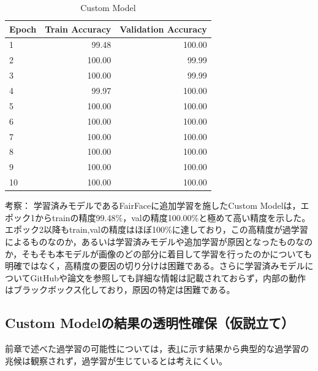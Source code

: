 \documentclass[a4paper,11pt,titlepage]{jsarticle}
\begin{document}
\begin{table}[H]
\centering
\caption{Custom Model}
\label{tab:Custom}
\begin{tabular}{lrr}
\hline
 Epoch &  Train Accuracy &  Validation Accuracy \\
\hline
     1 &           99.48 &               100.00 \\
     2 &          100.00 &                99.99 \\
     3 &          100.00 &                99.99 \\
     4 &           99.97 &               100.00 \\
     5 &          100.00 &               100.00 \\
     6 &          100.00 &               100.00 \\
     7 &          100.00 &               100.00 \\
     8 &          100.00 &               100.00 \\
     9 &          100.00 &               100.00 \\
    10 &          100.00 &               100.00 \\
\hline
\end{tabular}
\end{table}
% 

考察：
学習済みモデルであるFairFaceに追加学習を施したCustom Modelは，エポック1からtrainの精度99.48\%，valの精度100.00\%と極めて高い精度を示した。エポック2以降もtrain,valの精度はほぼ100\%に達しており，この高精度が過学習によるものなのか，あるいは学習済みモデルや追加学習が原因となったものなのか，そもそも本モデルが画像のどの部分に着目して学習を行ったのかについても明確ではなく，高精度の要因の切り分けは困難である。さらに学習済みモデルについてGitHubや論文を参照しても詳細な情報は記載されておらず，内部の動作はブラックボックス化しており，原因の特定は困難である。\par

\subsection{Custom Modelの結果の透明性確保（仮説立て）}
\label{label:仮設立て}

前章で述べた過学習の可能性については，表\ref{tab:Custom}に示す結果から典型的な過学習の兆候は観察されず，過学習が生じているとは考えにくい。\par
\end{document}
